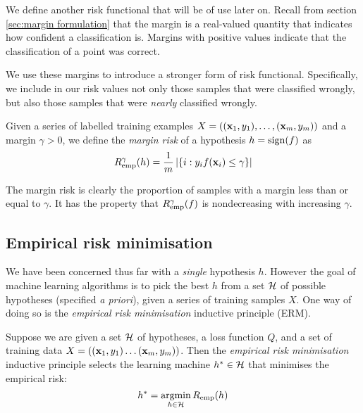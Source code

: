 We define another risk functional that will be of use later on.
Recall from section \ref{sec:margin formulation} that the margin is a
real-valued quantity that indicates how confident a classification
is.  Margins with positive values indicate that the classification of
a point was correct.

We use these margins to introduce a stronger form of risk functional.
Specifically, we include in our risk values not only those samples
that were classified wrongly, but also those samples that were
\emph{nearly} classified wrongly. 

\begin{definition}
\label{def:margin risk}
Given a series of labelled training examples $X = ((\mathbf{x}_1, y_1),
\ldots, (\mathbf{x}_m, y_m))$ and a margin $\gamma>0$, we define the
\emph{margin risk} of a hypothesis $h = \mathrm{sign}(f)$ as
%
\begin{equation}
R^{\gamma}_{\mathrm{emp}}(h) = \frac{1}{m} \left| \left\{ i : y_i f(\mathbf{x}_i) \leq
\gamma \right\} \right| 
\end{equation}
\end{definition}
%
The margin risk is clearly the proportion of samples with a margin
less than or equal to $\gamma$.  It has the property that
$R^{\gamma}_{\mathrm{emp}}(f)$ is nondecreasing with increasing $\gamma$.


\subsection{Empirical risk minimisation}
\label{sec:erm}
\label{acr:erm}

We have been concerned thus far with a \emph{single} hypothesis
$h$.  However the goal of machine learning algorithms is to pick the best
$h$ from a set $\mathcal{H}$ of possible hypotheses (specified \emph{a
priori}), given a series of training samples $X$.  One way of doing so
is the \emph{empirical risk minimisation} inductive principle (ERM).

\begin{definition}
Suppose we are given a set $\mathcal{H}$ of hypotheses, a loss
function $Q$, and a set of training data $X = ((\mathbf{x}_1, y_1) \ldots
(\mathbf{x}_m,y_m))$.  Then the \emph{empirical risk minimisation} inductive
principle selects the learning machine $h^{\ast} \in \mathcal{H}$ that
minimises the empirical risk:
%
\begin{equation}
h^{\ast} = \argmin_{h \in \calH} R_{\emp}(h)
\label{eqn:erm}
\end{equation}
\end{definition}

